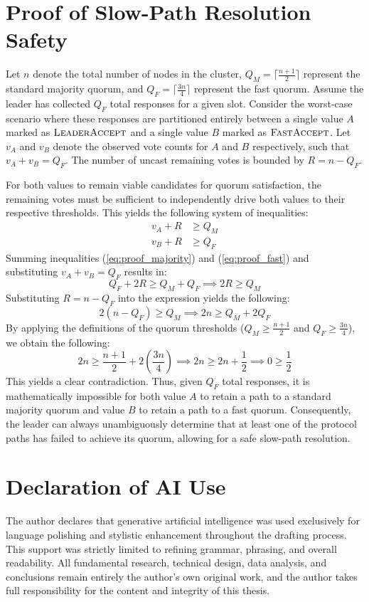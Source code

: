 \chapter{Proof of Slow-Path Resolution Safety}
\label{seca:slow_path_resolution_safety_proof}
Let $n$ denote the total number of nodes in the cluster, $Q_M = \lceil \frac{n+1}{2} \rceil$ represent the standard majority quorum, and $Q_F = \lceil \frac{3n}{4} \rceil$ represent the fast quorum. Assume the leader has collected $Q_F$ total responses for a given slot. Consider the worst-case scenario where these responses are partitioned entirely between a single value $A$ marked as $\textsc{LeaderAccept}$ and a single value $B$ marked as $\textsc{FastAccept}$. Let $v_A$ and $v_B$ denote the observed vote counts for $A$ and $B$ respectively, such that $v_A + v_B = Q_F$. The number of uncast remaining votes is bounded by $R = n - Q_F$.

For both values to remain viable candidates for quorum satisfaction, the remaining votes must be sufficient to independently drive both values to their respective thresholds. This yields the following system of inequalities:
\begin{align}
    v_A + R &\ge Q_M \label{eq:proof_majority} \\
    v_B + R &\ge Q_F \label{eq:proof_fast}
\end{align}
Summing inequalities (\ref{eq:proof_majority}) and (\ref{eq:proof_fast}) and substituting $v_A + v_B = Q_F$ results in:
\begin{equation}
    Q_F + 2R \ge Q_M + Q_F \implies 2R \ge Q_M
\end{equation}
Substituting $R = n - Q_F$ into the expression yields the following:
\begin{equation}
    2(n - Q_F) \ge Q_M \implies 2n \ge Q_M + 2Q_F
\end{equation}
By applying the definitions of the quorum thresholds ($Q_M \ge \frac{n+1}{2}$ and $Q_F \ge \frac{3n}{4}$), we obtain the following:
\begin{equation}
    2n \ge \frac{n+1}{2} + 2\left(\frac{3n}{4}\right) \implies 2n \ge 2n + \frac{1}{2} \implies 0 \ge \frac{1}{2}
\end{equation}
This yields a clear contradiction. Thus, given $Q_F$ total responses, it is mathematically impossible for both value $A$ to retain a path to a standard majority quorum and value $B$ to retain a path to a fast quorum. Consequently, the leader can always unambiguously determine that at least one of the protocol paths has failed to achieve its quorum, allowing for a safe slow-path resolution.


\chapter{Declaration of AI Use}
The author declares that generative artificial intelligence was used exclusively for language polishing and stylistic enhancement throughout the drafting process. This support was strictly limited to refining grammar, phrasing, and overall readability. All fundamental research, technical design, data analysis, and conclusions remain entirely the author's own original work, and the author takes full responsibility for the content and integrity of this thesis.
